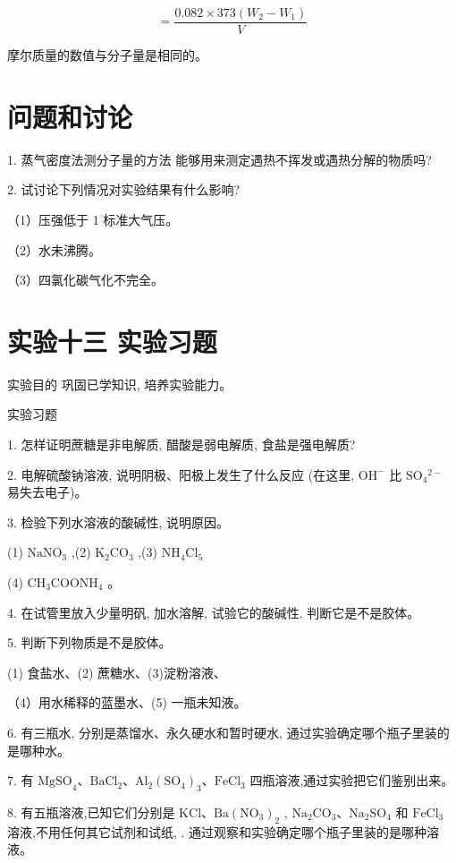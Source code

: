 \documentclass[10pt]{article}
\begin{document}
\[
= \frac{{0.082} \times {373}\left( {{W}_{2} - {W}_{1}}\right) }{V}
\]

摩尔质量的数值与分子量是相同的。

\section*{问题和讨论}

1. 蒸气密度法测分子量的方法 能够用来测定遇热不挥发或遇热分解的物质吗?

2. 试讨论下列情况对实验结果有什么影响?

（1）压强低于 1 标准大气压。

（2）水未沸腾。

（3）四氯化碳气化不完全。

\section*{实验十三 实验习题}

实验目的 巩固已学知识, 培养实验能力。

实验习题

1. 怎样证明蔗糖是非电解质, 醋酸是弱电解质, 食盐是强电解质?

2. 电解硫酸钠溶液, 说明阴极、阳极上发生了什么反应 (在这里, \({\mathrm{{OH}}}^{ - }\) 比 \({\mathrm{{SO}}}_{4}{}^{2 - }\) 易失去电子)。

3. 检验下列水溶液的酸碱性, 说明原因。

(1) \({\mathrm{{NaNO}}}_{3}\) ,(2) \({\mathrm{K}}_{2}{\mathrm{{CO}}}_{3}\) ,(3) \({\mathrm{{NH}}}_{4}{\mathrm{{Cl}}}_{5}\)

(4) \({\mathrm{{CH}}}_{3}{\mathrm{{COONH}}}_{4}\) 。

4. 在试管里放入少量明矾, 加水溶解, 试验它的酸碱性. 判断它是不是胶体。

5. 判断下列物质是不是胶体。

(1) 食盐水、(2) 蔗糖水、(3)淀粉溶液、

（4）用水稀释的蓝墨水、(5) 一瓶未知液。

6. 有三瓶水, 分别是蒸馏水、永久硬水和暂时硬水, 通过实验确定哪个瓶子里装的是哪种水。

7. 有 \({\mathrm{{MgSO}}}_{4}\text{、}{\mathrm{{BaCl}}}_{2}\text{、}{\mathrm{{Al}}}_{2}{\left( {\mathrm{{SO}}}_{4}\right) }_{3}\text{、}{\mathrm{{FeCl}}}_{3}\) 四瓶溶液,通过实验把它们鉴别出来。

8. 有五瓶溶液,已知它们分别是 \(\mathrm{{KCl}}\text{、}\mathrm{{Ba}}{\left( {\mathrm{{NO}}}_{3}\right) }_{2}\) , \({\mathrm{{Na}}}_{2}{\mathrm{{CO}}}_{3}\text{、}{\mathrm{{Na}}}_{2}{\mathrm{{SO}}}_{4}\) 和 \({\mathrm{{FeCl}}}_{3}\) 溶液,不用任何其它试剂和试纸, . 通过观察和实验确定哪个瓶子里装的是哪种溶液。
\end{document}
